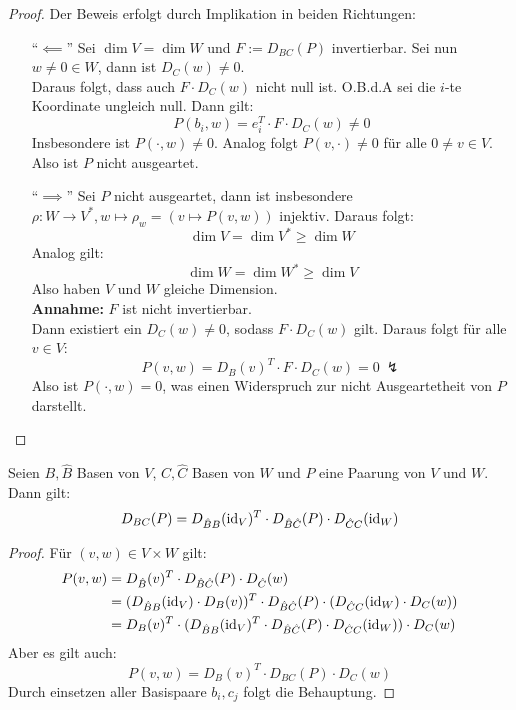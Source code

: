 \documentclass[parskip,a4paper,twoside,DIV15,BCOR12mm]{scrbook}
\begin{document}
\begin{proof}
Der Beweis erfolgt durch Implikation in beiden Richtungen:
\begin{enumerate}
\item["`$\impliedby$"'] Sei $\dim V=\dim W$ und $F:=D_{BC}(P)$ invertierbar.
Sei nun $w\ne 0\in W$, dann ist $D_C(w)\ne 0$.\\
Daraus folgt, dass auch $F\cdot D_C(w)$ nicht null ist. O.B.d.A sei die
$i$-te Koordinate ungleich null. Dann gilt:
\[P(b_i,w)=e_i^T\cdot F\cdot D_C(w)\ne 0\]
Insbesondere ist $P(\cdot,w)\ne 0$.
Analog folgt $P(v,\cdot)\ne 0$ für alle $0\ne v\in V$. Also ist $P$ nicht ausgeartet.
\item["`$\implies$"'] Sei $P$ nicht ausgeartet, dann ist insbesondere $\rho:W\to V^*,
w\mapsto \rho_w=(v\mapsto P(v,w))$ injektiv. Daraus folgt:
\[\dim V=\dim V^*\ge \dim W\]
Analog gilt:
\[\dim W=\dim W^*\ge \dim V\]
Also haben $V$ und $W$ gleiche Dimension.\\
\textbf{Annahme:} $F$ ist nicht invertierbar.\\
Dann existiert ein $D_C(w)\ne 0$, sodass $F\cdot D_C(w)$ gilt. Daraus folgt
für alle $v\in V$:
\[P(v,w)=D_B(v)^T\cdot F\cdot D_C(w)=0\ \lightning\]
Also ist $P(\cdot,w)=0$, was einen Widerspruch zur nicht Ausgeartetheit von $P$ darstellt.
\end{enumerate}
\end{proof}

\begin{theo}
Seien $B,\hat B$ Basen von $V$, $C,\hat C$ Basen von $W$ und $P$ eine Paarung von
$V$ und $W$. Dann gilt:
\[D_{BC}(P)=D_{\hat BB}(\operatorname{id}_V)^T\cdot D_{\hat B\hat C}(P)\cdot D_{\hat CC}(\operatorname{id}_W)\]
\end{theo}

\begin{proof}
Für $(v,w)\in V\times W$ gilt:
\begin{align*}
P(v,w)&=D_{\hat B}(v)^T\cdot D_{\hat B\hat C}(P)\cdot D_{\hat C}(w)\\
&=(D_{\hat BB}(\operatorname{id}_V)\cdot D_B(v))^T\cdot D_{\hat B\hat C}(P)\cdot(D_{\hat CC}(\operatorname{id}_W)\cdot D_C(w))\\
&=D_B(v)^T \cdot (D_{\hat BB}(\operatorname{id}_V)^T \cdot D_{\hat B\hat C}(P)\cdot D_{\hat CC}(\operatorname{id}_W))\cdot D_C(w)
\end{align*}
Aber es gilt auch:
\[P(v,w)=D_B(v)^T\cdot D_{BC}(P)\cdot D_C(w)\]
Durch einsetzen aller Basispaare $b_i,c_j$ folgt die Behauptung.
\end{proof}

\begin{comment}
Mit der Dualbasis $B^*=\{b_1^*,\ldots,b_m^*\}$ von $V^*$ zu $B$ (erinnere:
$b_k^*(b_i)=\delta_{ik}$) gilt für $\rho=\eta(P):W\to V^*$:
\[\rho(c_j)=\sum_{i=1}^n P(b_i,c_j)\cdot b_i^*\]
D.h. $D_{B^*C}(\rho)=D_{BC}(P)$.
\end{comment}
\end{document}
